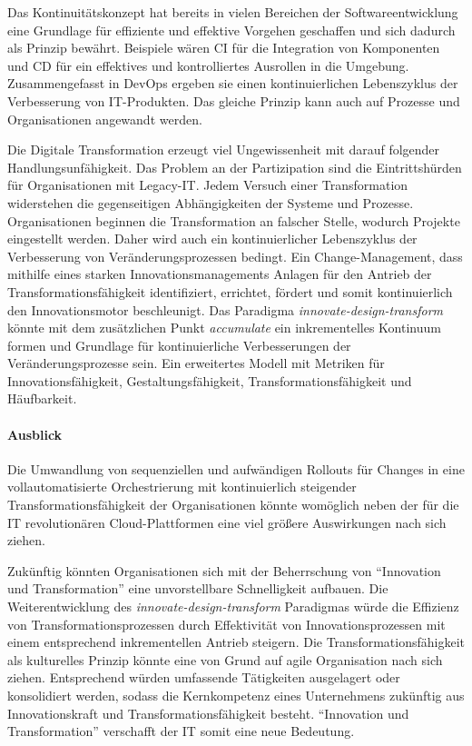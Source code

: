 Das Kontinuitätskonzept hat bereits in vielen Bereichen der Softwareentwicklung eine Grundlage für effiziente und effektive Vorgehen geschaffen und sich dadurch als Prinzip bewährt. Beispiele wären \ac{CI} für die Integration von Komponenten und \ac{CD} für ein effektives und kontrolliertes Ausrollen in die Umgebung. Zusammengefasst in DevOps ergeben sie einen kontinuierlichen Lebenszyklus der Verbesserung von IT-Produkten. Das gleiche Prinzip kann auch auf Prozesse und Organisationen angewandt werden.

Die Digitale Transformation erzeugt viel Ungewissenheit mit darauf folgender Handlungsunfähigkeit. Das Problem an der Partizipation sind die Eintrittshürden für Organisationen mit Legacy-IT. Jedem Versuch einer Transformation widerstehen die gegenseitigen Abhängigkeiten der Systeme und Prozesse. Organisationen beginnen die Transformation an falscher Stelle, wodurch Projekte eingestellt werden. Daher wird auch ein kontinuierlicher Lebenszyklus der Verbesserung von Veränderungsprozessen bedingt. Ein Change-Management, dass mithilfe eines starken Innovationsmanagements Anlagen für den Antrieb der Transformationsfähigkeit identifiziert, errichtet, fördert und somit kontinuierlich den Innovationsmotor beschleunigt.
Das Paradigma \emph{innovate-design-transform} \cite{Koch2016} könnte mit dem zusätzlichen Punkt \emph{accumulate} ein inkrementelles Kontinuum formen und Grundlage für kontinuierliche Verbesserungen der Veränderungsprozesse sein. Ein erweitertes Modell mit Metriken für Innovationsfähigkeit, Gestaltungsfähigkeit, Transformationsfähigkeit und Häufbarkeit.

\paragraph{Ausblick}

Die Umwandlung von sequenziellen und aufwändigen Rollouts für Changes in eine vollautomatisierte Orchestrierung mit kontinuierlich steigender Transformationsfähigkeit der Organisationen könnte womöglich neben der für die IT revolutionären Cloud-Plattformen eine viel größere Auswirkungen nach sich ziehen. 

Zukünftig könnten Organisationen sich mit der Beherrschung von \enquote{Innovation und Transformation} eine unvorstellbare Schnelligkeit aufbauen.
Die Weiterentwicklung des \emph{innovate-design-transform} Paradigmas würde die Effizienz von Transformationsprozessen durch Effektivität von Innovationsprozessen mit einem entsprechend inkrementellen Antrieb steigern. Die Transformationsfähigkeit als kulturelles Prinzip könnte eine von Grund auf agile Organisation nach sich ziehen. Entsprechend würden umfassende Tätigkeiten ausgelagert oder konsolidiert werden, sodass die Kernkompetenz eines Unternehmens zukünftig aus Innovationskraft und Transformationsfähigkeit besteht. \enquote{Innovation und Transformation} verschafft der IT somit eine neue Bedeutung.